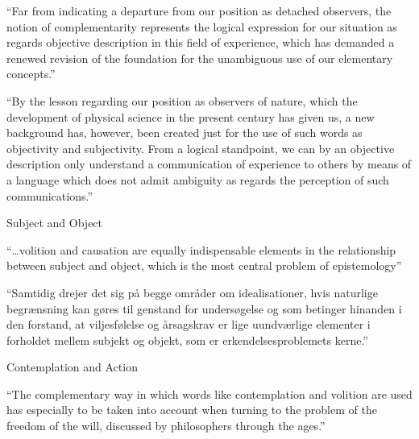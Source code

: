 \documentclass[fleqn]{beamer}
\begin{document}
\begin{frame}{\mbox{}}

  ``Far from indicating a departure from our position as detached
  observers, the notion of complementarity represents the logical
  expression for our situation as regards objective description in
  this field of experience, which has demanded a renewed revision of
  the foundation for the unambiguous use of our elementary concepts.''
  \citep[54]{unity55}


\end{frame}

\begin{frame}{\mbox{}}

  ``By the lesson regarding our position as observers of nature, which
  the development of physical science in the present century has given
  us, a new background has, however, been created just for the use of
  such words as objectivity and subjectivity. From a logical
  standpoint, we can by an objective description only understand a
  communication of experience to others by means of a language which
  does not admit ambiguity as regards the perception of such
  communications.'' \citep[386]{religion54}

\end{frame}


\begin{frame}{Subject and Object}

  ``\dots volition and causation are equally indispensable elements in
  the relationship between subject and object, which is the most
  central problem of epistemology''

  \bigskip ``Samtidig drejer det sig på begge områder om
  idealisationer, hvis naturlige begrænsning kan gøres til genstand
  for undersøgelse og som betinger hinanden i den forstand, at
  viljesfølelse og årsagskrav er lige uundværlige elementer i
  forholdet mellem subjekt og objekt, som er erkendelsesproblemets
  kerne.'' \citep[82]{bohr-atomteori}

\end{frame}

\begin{frame}{Contemplation and Action}

  ``The complementary way in which words like contemplation and
  volition are used has especially to be taken into account when
  turning to the problem of the freedom of the will, discussed by
  philosophers through the ages.'' \citep[66]{unity}

\end{frame}
\end{document}
